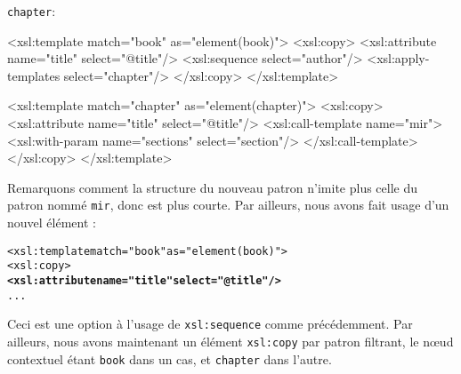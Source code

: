 \texttt{chapter}:
\begin{sverb}
  <xsl:template match="book" as="element(book)">
    <xsl:copy>
      <xsl:attribute name="title" select="@title"/>
      <xsl:sequence select="author"/>
      <xsl:apply-templates select="chapter"/>
    </xsl:copy>
  </xsl:template>

  <xsl:template match="chapter" as="element(chapter)">
    <xsl:copy>
      <xsl:attribute name="title" select="@title"/>
      <xsl:call-template name="mir">
        <xsl:with-param name="sections" select="section"/>
      </xsl:call-template>
    </xsl:copy>
  </xsl:template>
\end{sverb}
Remarquons comment la structure du nouveau patron n'imite plus celle
du patron nommé \texttt{mir}, donc est plus courte. Par ailleurs, nous
avons fait usage d'un nouvel élément \XSLT:
\begin{alltt}
\small <xsl:template match="book" as="element(book)">
    <xsl:copy>
      \textbf{<xsl:attribute name="title" select="@title"/>}
      ...
\end{alltt}
Ceci est une option à l'usage de \texttt{xsl:sequence} comme
précédemment. Par ailleurs, nous avons maintenant un élément
\texttt{xsl:copy} par patron filtrant, le nœud contextuel étant
\texttt{book} dans un cas, et \texttt{chapter} dans l'autre.

